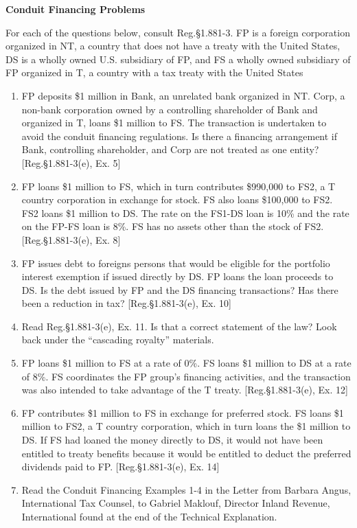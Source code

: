 	\begin{center}
		\textbf{Conduit Financing Problems}
	\end{center}
	\begin{select}
	
For each of the questions below, consult Reg.\@ \S 1.881-3.  FP is a foreign corporation organized in NT, a country that does not have a treaty with the United States, DS is a wholly owned U.S. subsidiary of FP, and FS a wholly owned subsidiary of FP organized in T, a country with a tax treaty with the United States 

	\begin{enumerate}
		\item FP deposits \$1 million in Bank, an unrelated bank organized in NT.  Corp, a non-bank corporation owned by a controlling shareholder of Bank and organized in T, loans \$1 million to FS.  The transaction is undertaken to avoid the conduit financing regulations.  Is there a financing arrangement if Bank, controlling shareholder, and Corp are not treated as one entity?  [Reg.\@ \S 1.881-3(e), Ex. 5]
			\item FP loans \$1 million to FS, which in turn contributes \$990,000 to FS2, a T country corporation in exchange for stock.  FS also loans \$100,000 to FS2.  FS2 loans \$1 million to DS.  The rate on the FS1-DS loan is 10\% and the rate on the FP-FS loan is 8\%.  FS has no assets other than the stock of FS2. [Reg.\@ \S 1.881-3(e), Ex. 8]
			\item FP issues debt to foreigns persons that would be eligible for the portfolio interest exemption if issued directly by DS.  FP loans the loan proceeds to DS.  Is the debt issued by FP and the DS financing transactions?  Has there been a reduction in tax?  [Reg.\@ \S 1.881-3(e), Ex. 10]
			\item Read Reg.\@ \S 1.881-3(e), Ex. 11.  Is that a correct statement of the law?  Look back under the ``cascading royalty'' materials.
			\item FP loans \$1 million to FS at a rate of 0\%.  FS loans \$1 million to DS at a rate of 8\%. FS coordinates the FP group's financing activities, and the transaction was also intended to take advantage of the T treaty. [Reg.\@ \S 1.881-3(e), Ex. 12]
			\item  FP contributes \$1 million to FS in exchange for preferred stock.  FS loans \$1 million to FS2, a T country corporation, which in turn loans the \$1 million to DS.  If FS had loaned the money directly to DS, it would not have been entitled to treaty benefits because it would be entitled to deduct the preferred dividends paid to FP.  [Reg.\@ \S 1.881-3(e), Ex. 14]  
			\item Read the Conduit Financing Examples 1-4 in the Letter from Barbara Angus, International Tax Counsel, to Gabriel Maklouf, Director Inland Revenue, International found at the end of the Technical Explanation.
	\end{enumerate}
	\end{select}

